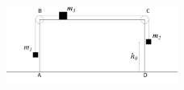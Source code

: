 
\begin{problem}[A1969AMIIQ2a] %
{\begin{figure}[h]
\centering
\includegraphics[width=0.5\textwidth]{../../../figures/Dynamics_table_pulley_masses}
\caption{}\label{fig:Dynamics_table_pulley_masses}
\end{figure}

}
\end{problem}
